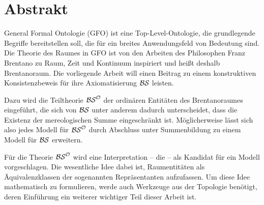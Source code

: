 \chapter*{Abstrakt}

General Formal Ontologie (GFO) ist eine Top-Level-Ontologie, die grundlegende Begriffe bereitstellen soll, die für ein breites Anwendungsfeld von Bedeutung sind.
Die Theorie des Raumes in GFO ist von den Arbeiten des Philosophen Franz Brentano zu Raum, Zeit und Kontinuum inspiriert und heißt deshalb Brentanoraum.
Die vorliegende Arbeit will einen Beitrag zu einem konstruktiven Konsistenzbeweis für ihre Axiomatisierung $\mathcal{BS}$ leisten.

Dazu wird die Teiltheorie $\mathcal{BS}^{\mathcal{O}}$ der ordinären Entitäten des Brentanoraumes eingeführt, die sich von $\mathcal{BS}$ unter anderem dadurch unterscheidet, dass die Existenz der mereologischen Summe eingeschränkt ist.
Möglicherweise lässt sich also jedes Modell für $\mathcal{BS}^{\mathcal{O}}$ durch Abschluss unter Summenbildung zu einem Modell für $\mathcal{BS}$ erweitern.

Für die Theorie $\mathcal{BS}^{\mathcal{O}}$ wird eine Interpretation -- die \strukt -- als Kandidat für ein Modell vorgeschlagen.
Die wesentliche Idee dabei ist, Raumentitäten als Äquivalenzklassen der sogenannten Repräsentanten aufzufassen.
Um diese Idee mathematisch zu formulieren, werde auch Werkzeuge aus der Topologie benötigt, deren Einführung ein weiterer wichtiger Teil dieser Arbeit ist.

%
%     
%     








